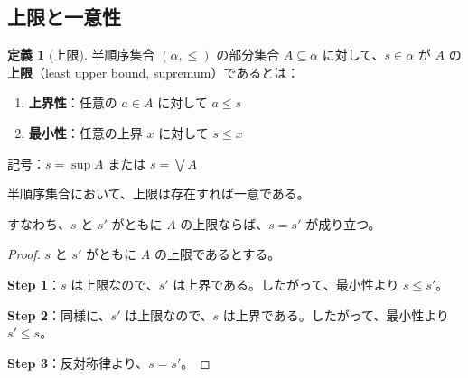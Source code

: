 \documentclass[a4paper,12pt]{ltjsarticle}
\theoremstyle{definition}
\newtheorem{definition}[theorem]{定義}
\begin{document}
\begin{center}
\end{center}

\subsection{上限と一意性}

\begin{definition}[上限]\label{def:lub}
半順序集合 $(\alpha, \leq)$ の部分集合 $A \subseteq \alpha$ に対して、$s \in \alpha$ が $A$ の\textbf{上限}（least upper bound, supremum）であるとは：
\begin{enumerate}
\item \textbf{上界性}：任意の $a \in A$ に対して $a \leq s$
\item \textbf{最小性}：任意の上界 $x$ に対して $s \leq x$
\end{enumerate}
記号：$s = \sup A$ または $s = \bigvee A$
\end{definition}

\begin{maintheorem}[上限の一意性]\label{thm:lub_unique}
半順序集合において、上限は存在すれば一意である。

すなわち、$s$ と $s'$ がともに $A$ の上限ならば、$s = s'$ が成り立つ。
\end{maintheorem}

\begin{proof}
$s$ と $s'$ がともに $A$ の上限であるとする。

\textbf{Step 1}：$s$ は上限なので、$s'$ は上界である。したがって、最小性より $s \leq s'$。

\textbf{Step 2}：同様に、$s'$ は上限なので、$s$ は上界である。したがって、最小性より $s' \leq s$。

\textbf{Step 3}：反対称律より、$s = s'$。
\end{proof}
\end{document}
